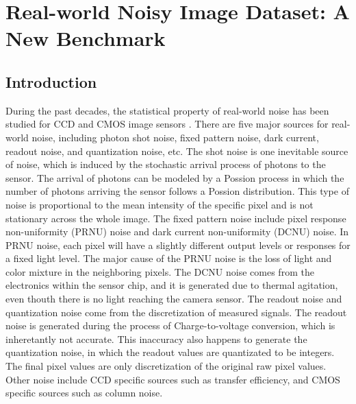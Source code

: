 %
\chapter{Real-world Noisy Image Dataset: A New Benchmark}
\label{sec:dataset}

\section{Introduction}

During the past decades, the statistical property of real-world noise has been studied for CCD and CMOS image sensors \cite{healey1994radiometric,tsin2001statistical,RENOIR2014,crosschannel2016,dnd2017}. There are five major sources for real-world noise, including photon shot noise, fixed pattern noise, dark current, readout noise, and quantization noise, etc. The shot noise is one inevitable source of noise, which is induced by the stochastic arrival process of photons to the sensor. The arrival of photons can be modeled by a Possion process in which the number of photons arriving the sensor follows a Possion distribution. This type of noise is proportional to the mean intensity of the specific pixel and is not stationary across the whole image. The fixed pattern noise include pixel response non-uniformity (PRNU) noise and dark current non-uniformity (DCNU) noise. In PRNU noise, each pixel will have a slightly different output levels or responses for a fixed light level. The major cause of the PRNU noise is the loss of light and color mixture in the neighboring pixels. The DCNU noise comes from the electronics within the sensor chip, and it is generated due to thermal agitation, even thouth there is no light reaching the camera sensor. The readout noise and quantization noise come from the discretization of measured signals. The readout noise is generated during the process of Charge-to-voltage conversion, which is inheretantly not accurate. This inaccuracy also happens to generate the quantization noise, in which the readout values are quantizated to be integers. The final pixel values are only discretization of the original raw pixel values. Other noise include CCD specific sources such as transfer efficiency, and CMOS specific sources such as column noise.

